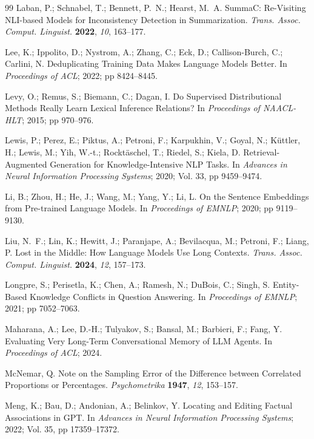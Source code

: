 \documentclass[journal=jcisd8,manuscript=article]{achemso}
\begin{document}
\begin{thebibliography}{99}
 Laban, P.; Schnabel, T.; Bennett, P.~N.; Hearst, M.~A. SummaC: Re-Visiting NLI-based Models for Inconsistency Detection in Summarization. \emph{Trans. Assoc. Comput. Linguist.} \textbf{2022}, \emph{10}, 163--177.

 Lee, K.; Ippolito, D.; Nystrom, A.; Zhang, C.; Eck, D.; Callison-Burch, C.; Carlini, N. Deduplicating Training Data Makes Language Models Better. In \emph{Proceedings of ACL}; 2022; pp 8424--8445.

 Levy, O.; Remus, S.; Biemann, C.; Dagan, I. Do Supervised Distributional Methods Really Learn Lexical Inference Relations? In \emph{Proceedings of NAACL-HLT}; 2015; pp 970--976.

 Lewis, P.; Perez, E.; Piktus, A.; Petroni, F.; Karpukhin, V.; Goyal, N.; K\"uttler, H.; Lewis, M.; Yih, W.-t.; Rockt\"aschel, T.; Riedel, S.; Kiela, D. Retrieval-Augmented Generation for Knowledge-Intensive NLP Tasks. In \emph{Advances in Neural Information Processing Systems}; 2020; Vol. 33, pp 9459--9474.

 Li, B.; Zhou, H.; He, J.; Wang, M.; Yang, Y.; Li, L. On the Sentence Embeddings from Pre-trained Language Models. In \emph{Proceedings of EMNLP}; 2020; pp 9119--9130.

 Liu, N.~F.; Lin, K.; Hewitt, J.; Paranjape, A.; Bevilacqua, M.; Petroni, F.; Liang, P. Lost in the Middle: How Language Models Use Long Contexts. \emph{Trans. Assoc. Comput. Linguist.} \textbf{2024}, \emph{12}, 157--173.

 Longpre, S.; Perisetla, K.; Chen, A.; Ramesh, N.; DuBois, C.; Singh, S. Entity-Based Knowledge Conflicts in Question Answering. In \emph{Proceedings of EMNLP}; 2021; pp 7052--7063.

 Maharana, A.; Lee, D.-H.; Tulyakov, S.; Bansal, M.; Barbieri, F.; Fang, Y. Evaluating Very Long-Term Conversational Memory of LLM Agents. In \emph{Proceedings of ACL}; 2024.

 McNemar, Q. Note on the Sampling Error of the Difference between Correlated Proportions or Percentages. \emph{Psychometrika} \textbf{1947}, \emph{12}, 153--157.

 Meng, K.; Bau, D.; Andonian, A.; Belinkov, Y. Locating and Editing Factual Associations in GPT. In \emph{Advances in Neural Information Processing Systems}; 2022; Vol. 35, pp 17359--17372.


\end{thebibliography}
\end{document}
